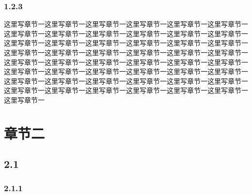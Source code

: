 \documentclass[UTF8,12pt,a4paper]{ctexart}
\begin{document}
\subsubsection{1.2.3}
这里写章节一这里写章节一这里写章节一这里写章节一这里写章节一这里写章节一这里写章节一这里写章节一这里写章节一这里写章节一这里写章节一这里写章节一这里写章节一这里写章节一这里写章节一这里写章节一这里写章节一这里写章节一这里写章节一这里写章节一这里写章节一这里写章节一这里写章节一这里写章节一这里写章节一这里写章节一这里写章节一这里写章节一这里写章节一这里写章节一这里写章节一这里写章节一这里写章节一这里写章节一这里写章节一这里写章节一这里写章节一这里写章节一这里写章节一这里写章节一这里写章节一这里写章节一这里写章节一这里写章节一这里写章节一这里写章节一这里写章节一这里写章节一这里写章节一

\newpage
\section{章节二}
\subsection{2.1}
\subsubsection{2.1.1}
\end{document}
